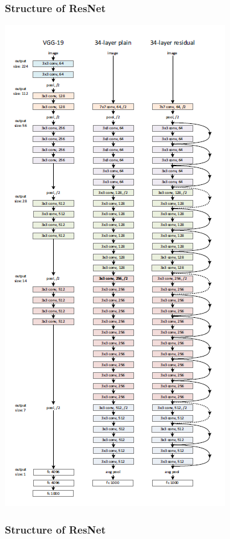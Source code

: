 \begin{frame}[allowframebreaks]
	\frametitle{Structure of ResNet}

	\begin{center}
		\includegraphics[scale=0.5]{figs/ResNet_structure}
	\end{center}

\framebreak

\frametitle{Structure of ResNet}
\begin{columns} %



\end{columns}
\end{frame}
